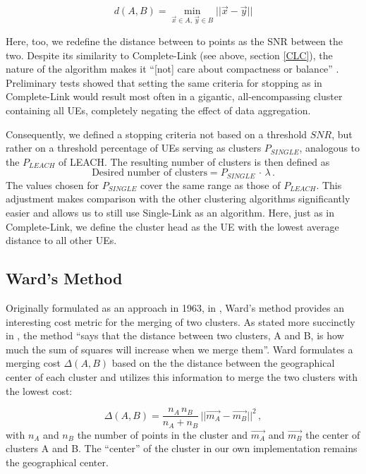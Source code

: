 \begin{equation}\label{eq:SLC}
d(A,B) = \min_{\vec{x} \in A,\,\vec{y} \in B} ||\vec{x}  - \vec{y}||
\end{equation}

Here, too, we redefine the distance between to points as the SNR between the two. Despite its similarity to Complete-Link (see above, section \ref{CLC}), the nature of the algorithm makes it ``[not] care about compactness or balance'' \cite{Shalizi2009}. Preliminary tests showed that setting the same criteria for stopping as in Complete-Link would result most often in a gigantic, all-encompassing cluster containing all UEs, completely negating the effect of data aggregation. 

Consequently, we defined a stopping criteria not based on a threshold $SNR$, but rather on a threshold percentage of UEs serving as clusters $P_{SINGLE}$, analogous to the $P_{LEACH}$ of LEACH. The resulting number of clusters is then defined as 
\begin{equation}
\text{Desired number of clusters} = P_{SINGLE}\,\cdot\,\lambda\,.
\end{equation}
The values chosen for $P_{SINGLE}$ cover the same range as those of $P_{LEACH}$. This adjustment makes comparison with the other clustering algorithms significantly easier and allows us to still use Single-Link as an algorithm. Here, just as in Complete-Link, we define the cluster head as the UE with the lowest average distance to all other UEs.

\subsection{Ward's Method}\label{WM}
Originally formulated as an approach in 1963, in \cite{Ward1963}, Ward's method provides an interesting cost metric for the merging of two clusters. As stated more succinctly in \cite{Shalizi2009}, the method ``says that the distance between two clusters, A and B, is how much the sum of squares will increase when we merge them''. Ward formulates a merging cost $\Delta(A,B)$ based on the the distance between the geographical center of each cluster and utilizes this information to merge the two clusters with the lowest cost:

\begin{equation}\label{eq:wards_cost}
\Delta(A,B) = \frac {n_A\,n_B}{n_A + n_B}\,||\vec{m_A} - \vec{m_B}||^2\,,
\end{equation}
with $n_A$ and $n_B$ the number of points in the cluster and $\vec{m_A}$ and $\vec{m_B}$ the center of clusters A and B. The ``center'' of the cluster in our own implementation remains the geographical center.

